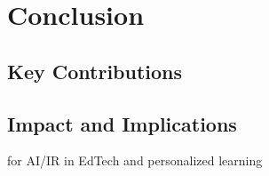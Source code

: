 \chapter{Conclusion} \label{chap:chap-7}



\section{Key Contributions}

\section{Impact and Implications}

for AI/IR in EdTech and personalized learning 


